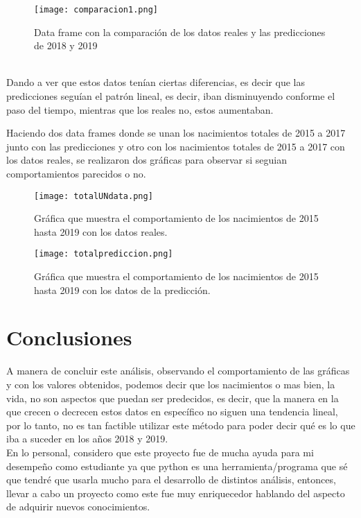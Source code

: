 \documentclass{article}
\begin{document}
\begin{figure}[h]
    \centering
    \texttt{[image: comparacion1.png]}
    \caption{Data frame con la comparación de los datos reales y las predicciones de 2018 y 2019}
    \label{fig:my_label}
\end{figure}\\
Dando a ver que estos datos tenían ciertas diferencias, es decir que las predicciones seguían el patrón lineal, es decir, iban disminuyendo conforme el paso del tiempo, mientras que los reales no, estos aumentaban.

Haciendo dos data frames donde se unan los nacimientos totales de 2015 a 2017 junto con las predicciones y otro con los nacimientos totales de 2015 a 2017 con los datos reales, se realizaron dos gráficas para observar si seguian comportamientos parecidos o no. 

\begin{figure}[h]
    \centering
    \texttt{[image: totalUNdata.png]}
    \caption{Gráfica que muestra el comportamiento de los nacimientos de 2015 hasta 2019 con los datos reales.}
    \label{fig:my_label}
\end{figure}
\begin{figure}[h]
    \centering
    \texttt{[image: totalprediccion.png]}
    \caption{Gráfica que muestra el comportamiento de los nacimientos de 2015 hasta 2019 con los datos de la predicción.}
    \label{fig:my_label}
\end{figure}
\pagebreak





\section{Conclusiones}
A manera de concluir este análisis, observando el comportamiento de las gráficas y con los valores obtenidos, podemos decir que los nacimientos o mas bien, la  vida, no son aspectos que puedan ser predecidos, es decir, que la manera en la que crecen o decrecen estos datos en específico no siguen una tendencia lineal, por lo tanto, no es tan factible utilizar este método para poder decir qué es lo que iba a suceder en los años 2018 y 2019. \\


En lo personal, considero que este proyecto fue de mucha ayuda para mi desempeño como estudiante ya que python es una herramienta/programa que sé que tendré que usarla mucho para el desarrollo de distintos análisis, entonces, llevar a cabo un proyecto como este fue muy enriquecedor hablando del aspecto de adquirir nuevos conocimientos.



\end{document}
